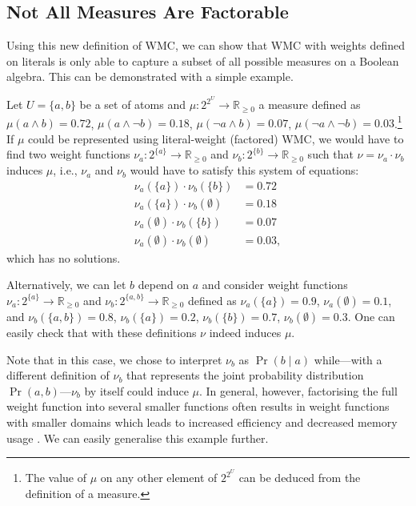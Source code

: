 \subsection{Not All Measures Are Factorable}

Using this new definition of WMC, we can show that WMC with weights defined on
literals is only able to capture a subset of all possible measures on a
Boolean algebra. This can be demonstrated with a simple example.

\begin{example}
  Let $U = \{a, b\}$ be a set of atoms and $\mu\colon 2^{2^U} \to
  \mathbb{R}_{\ge 0}$ a measure defined as $\mu(a \land b) = 0.72$, $\mu(a \land
  \neg b) = 0.18$, $\mu(\neg a \land b) = 0.07$, $\mu(\neg a \land \neg b) =
  0.03$.\footnote{The value of $\mu$ on any other element of $2^{2^U}$ can be
    deduced from the definition of a measure.} If $\mu$ could be represented
  using literal-weight (factored) WMC, we would have to find two weight
  functions $\nu_a\colon 2^{\{a\}} \to \mathbb{R}_{\ge 0}$ and $\nu_b\colon
  2^{\{b\}} \to \mathbb{R}_{\ge 0}$ such that $\nu = \nu_a \cdot \nu_b$ induces
  $\mu$, i.e., $\nu_a$ and $\nu_b$ would have to satisfy this system of
  equations:
  \begin{align*}
    \nu_a(\{a\}) \cdot \nu_b(\{b\}) &= 0.72 \\
    \nu_a(\{a\}) \cdot \nu_b(\emptyset) &= 0.18 \\
    \nu_a(\emptyset) \cdot \nu_b(\{b\}) &= 0.07 \\
    \nu_a(\emptyset) \cdot \nu_b(\emptyset) &= 0.03,
  \end{align*}
  which has no solutions.

  Alternatively, we can let $b$ depend on $a$ and consider weight functions
  $\nu_a\colon 2^{\{a\}} \to \mathbb{R}_{\ge 0}$ and $\nu_b\colon 2^{\{a, b\}}
  \to \mathbb{R}_{\ge 0}$ defined as $\nu_a(\{a\}) = 0.9$, $\nu_a(\emptyset) =
  0.1$, and $\nu_b(\{a, b\}) = 0.8$, $\nu_b(\{a\}) = 0.2$, $\nu_b(\{b\}) = 0.7$,
  $\nu_b(\emptyset) = 0.3$. One can easily check that with these definitions
  $\nu$ indeed induces $\mu$.
\end{example}

Note that in this case, we chose to interpret $\nu_b$ as $\Pr(b \mid a)$
while---with a different definition of $\nu_b$ that represents the joint
probability distribution $\Pr(a, b)$---$\nu_b$ by itself could induce $\mu$. In
general, however, factorising the full weight function into several smaller
functions often results in weight functions with smaller domains which leads to
increased efficiency and decreased memory usage
\citep{DBLP:conf/aaai/DudekPV20}. We can easily generalise this example further.


